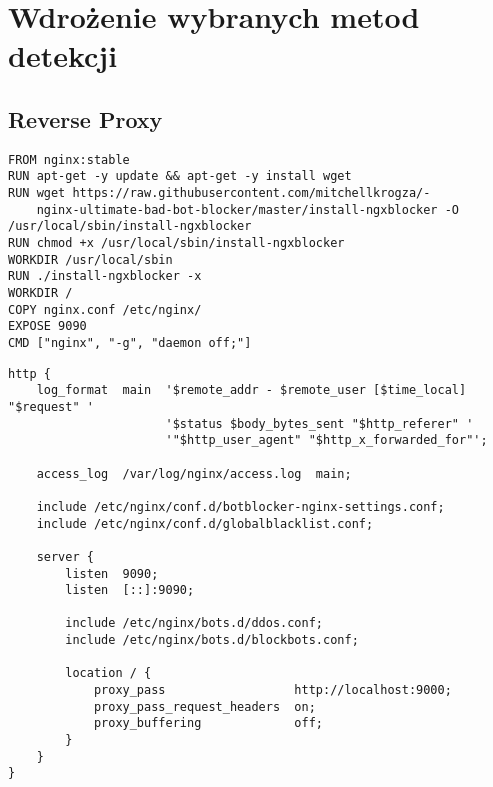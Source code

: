 \newpage


\section{Wdrożenie wybranych metod detekcji}\label{sec:wdrozenie-metod-detekcji}

\subsection{Reverse Proxy}


\begin{figure*}[p]
    \begin{listing}[H]
        \begin{verbatim}
FROM nginx:stable
RUN apt-get -y update && apt-get -y install wget
RUN wget https://raw.githubusercontent.com/mitchellkrogza/-
    nginx-ultimate-bad-bot-blocker/master/install-ngxblocker -O /usr/local/sbin/install-ngxblocker
RUN chmod +x /usr/local/sbin/install-ngxblocker
WORKDIR /usr/local/sbin
RUN ./install-ngxblocker -x
WORKDIR /
COPY nginx.conf /etc/nginx/
EXPOSE 9090
CMD ["nginx", "-g", "daemon off;"]
        \end{verbatim}
        \caption{}
        \label{lst:nginx-bot-blocker-dockerfile}
    \end{listing}

    \begin{listing}[H]
        \begin{verbatim}
http {
    log_format  main  '$remote_addr - $remote_user [$time_local] "$request" '
                      '$status $body_bytes_sent "$http_referer" '
                      '"$http_user_agent" "$http_x_forwarded_for"';

    access_log  /var/log/nginx/access.log  main;

    include /etc/nginx/conf.d/botblocker-nginx-settings.conf;
    include /etc/nginx/conf.d/globalblacklist.conf;

    server {
	    listen  9090;
	    listen  [::]:9090;

	    include /etc/nginx/bots.d/ddos.conf;
        include /etc/nginx/bots.d/blockbots.conf;

	    location / {
		    proxy_pass                  http://localhost:9000;
		    proxy_pass_request_headers  on;
		    proxy_buffering             off;
	    }
    }
}
        \end{verbatim}
        \caption{}
        \label{lst:nginx-bot-blocker-conf}
    \end{listing}
\end{figure*}

